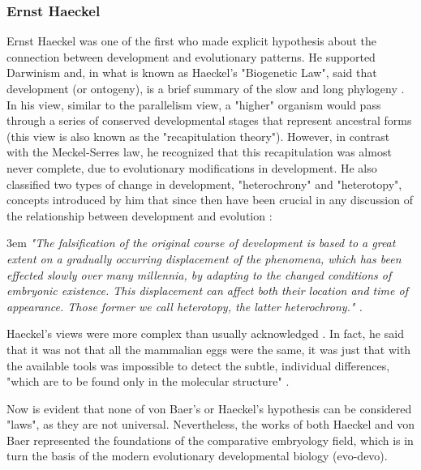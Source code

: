 \subsubsection{Ernst Haeckel}
Ernst Haeckel was one of the first who made explicit hypothesis about the connection between development and evolutionary patterns.
He supported Darwinism and, in what is known as Haeckel's "Biogenetic Law", said that development (or ontogeny), is a brief summary of the slow and long phylogeny \citep{haeckel1874menschen}.
In his view, similar to the parallelism view, a "higher" organism would pass through a series of conserved developmental stages that represent ancestral forms (this view is also known as the "recapitulation theory").
However, in contrast with the Meckel-Serres law, he recognized that this recapitulation was almost never complete, due to evolutionary modifications in development. 
He also classified two types of change in development, "heterochrony" and "heterotopy", concepts introduced by him that since then have been crucial in any discussion of the relationship between development and evolution \citep{Horder2013}:
\begin{flushleft}
\leftskip3em
\rightskip\leftskip
\footnotesize{
\textit{"The falsification of the original course of development is based to a great extent on a gradually occurring displacement of the phenomena, which has been effected slowly over many millennia, by adapting to the changed conditions of embryonic existence. This displacement can affect both their location and time of appearance. Those former we call heterotopy, the latter heterochrony." \citep{haeckel1903anthropogenie}.}}
\end{flushleft}
Haeckel's views were more complex than usually acknowledged \citep{Richardson2002}.
In fact, he said that it was not that all the mammalian eggs were the same, it was just that with the available tools was impossible to detect the subtle, individual differences, "which are to be found only in the molecular structure" \citep{haeckel1903anthropogenie}.

Now is evident that none of von Baer's or Haeckel's hypothesis can be considered "laws", as they are not universal.
Nevertheless, the works of both Haeckel and von Baer represented the foundations of the comparative embryology field, which is in turn the basis of the modern evolutionary developmental biology (evo-devo).


